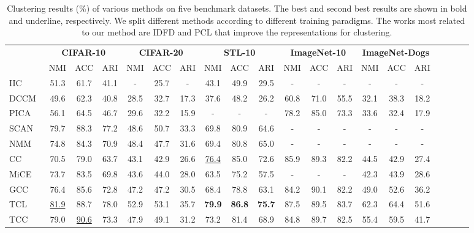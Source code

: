 \begin{table*}[t]
  \centering
  \caption{Clustering results (\%) of various methods on five benchmark datasets. The best and second best results are shown in bold and underline, respectively. We split different methods according to different training paradigms. The works most related to our method are IDFD and PCL that improve the representations for clustering.
  }
  \label{tab:results}
  \begin{threeparttable}
  \begin{tabular*}{1\linewidth}{@{\extracolsep{\fill}}l*{19}{c}}
    \shline
    \multirow{3}{*}{\textbf{Method}} & \multicolumn{3}{c}{\textbf{CIFAR-10}} & \multicolumn{3}{c}{\textbf{CIFAR-20}} &\multicolumn{3}{c}{\textbf{STL-10}} & \multicolumn{3}{c}{\textbf{ImageNet-10}} & \multicolumn{3}{c}{\textbf{ImageNet-Dogs}}\\
    \cmidrule{2-16}
     & NMI & ACC & ARI & NMI & ACC & ARI & NMI & ACC & ARI & NMI & ACC & ARI & NMI & ACC & ARI\\
    \midrule
    IIC~\cite{ji2019invariant} & 51.3 & 61.7 & 41.1    & -    & 25.7 & -        & 43.1 & 49.9 & 29.5  & -    & -    & -          & -    & -    & -     \\
    DCCM~\cite{wu2019deep} & 49.6 & 62.3 & 40.8 & 28.5 & 32.7 & 17.3 & 37.6 & 48.2 & 26.2 & 60.8 & 71.0 & 55.5 & 32.1 & 38.3 & 18.2    \\

    PICA~\cite{huang2020deep} & 56.1 & 64.5 & 46.7    & 29.6 & 32.2 & 15.9     & -    & -    & -     & 78.2 & 85.0 & 73.3      & 33.6 & 32.4 & 17.9         \\
    \midrule
    SCAN~\cite{van2020scan} &  79.7 & 88.3 & 77.2 & 48.6 & 50.7 & 33.3 & 69.8 & 80.9 & 64.6 & - & - & - & - & - & -\\
    NMM~\cite{Dang_2021_CVPR} & 74.8 & 84.3 & 70.9 & 48.4 & 47.7 & 31.6 & 69.4 & 80.8 & 65.0 & - & - & - & - & - & -\\
    
    \midrule
    
    CC~\cite{li2021contrastive} &  70.5 & 79.0 & 63.7 & 43.1 & 42.9 & 26.6 & \underline{76.4} & 85.0 & 72.6 & 85.9 & 89.3 & 82.2 & 44.5 & 42.9 & 27.4\\
    MiCE~\cite{tsai2020mice} & 73.7 & 83.5 & 69.8 & 43.6 & 44.0 & 28.0 & 63.5 & 75.2 & 57.5 & - & - & - & 42.3 & 43.9 & 28.6\\
    GCC~\cite{zhong2021graph} & 76.4 & 85.6 & 72.8 & 47.2 & 47.2 & 30.5 & 68.4 & 78.8 & 63.1 & 84.2 & 90.1 & 82.2 & 49.0 & 52.6 & 36.2\\
    TCL~\cite{li2022twin} & \underline{81.9} & 88.7 & 78.0 & 52.9 & 53.1 & 35.7 & \textbf{79.9} & \textbf{86.8} & \textbf{75.7} & 87.5 & 89.5 & 83.7 & 62.3 & 64.4 & 51.6 \\
    TCC~\cite{shen2021you} & 79.0 & \underline{90.6} & 73.3 & 47.9 & 49.1 & 31.2 & 73.2 & 81.4 & 68.9 & 84.8 & 89.7 & 82.5 & 55.4 & 59.5 & 41.7 \\


\end{tabular*}
\end{threeparttable}
\end{table*}
